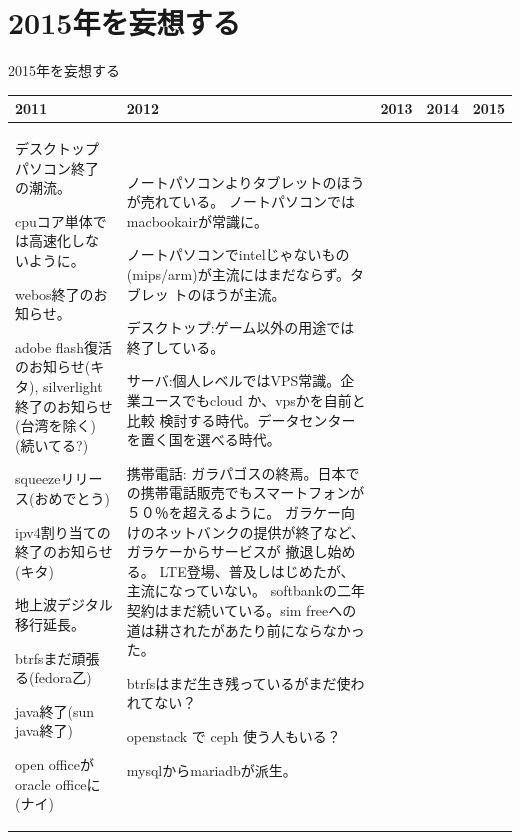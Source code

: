 \section{2015年を妄想する}
\begin{frame}{2015年を妄想する}
 
 { \tiny
\begin{tabular}[t]{|p{8.5em}|p{12em}|p{8em}|p{6em}|p{8em}|}
 \hline
 2011 &2012 & 2013 & 2014 & 2015 \\
 \hline


 デスクトップパソコン終了の潮流。

 cpuコア単体では高速化しないように。

 webos終了のお知らせ。

 adobe flash復活のお知らせ(キタ), silverlight終了のお知らせ(台湾を除く)(続いてる?)

 squeezeリリース(おめでとう)

 ipv4割り当ての終了のお知らせ(キタ)

 地上波デジタル移行延長。

 btrfsまだ頑張る(fedora乙)

 java終了(sun java終了)

 open officeがoracle officeに(ナイ)

 &

 ノートパソコンよりタブレットのほうが売れている。
 ノートパソコンではmacbookairが常識に。

 ノートパソコンでintelじゃないもの(mips/arm)が主流にはまだならず。タブレッ
 トのほうが主流。

 デスクトップ:ゲーム以外の用途では終了している。

 サーバ:個人レベルではVPS常識。企業ユースでもcloud か、vpsかを自前と比較
     検討する時代。データセンターを置く国を選べる時代。

 携帯電話:
 ガラパゴスの終焉。日本での携帯電話販売でもスマートフォンが５０％を超えるように。
     ガラケー向けのネットバンクの提供が終了など、ガラケーからサービスが
     撤退し始める。
 LTE登場、普及しはじめたが、主流になっていない。
 softbankの二年契約はまだ続いている。sim freeへの道は耕されたがあたり前にならなかった。

 btrfsはまだ生き残っているがまだ使われてない？

     openstack で ceph 使う人もいる？

 mysqlからmariadbが派生。

 & 


\end{tabular}}
\end{frame}
